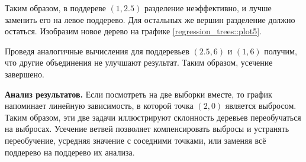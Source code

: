     Таким образом, в поддереве $(1, 2.5)$ разделение неэффективно, и лучше заменить его на левое поддерево. Для остальных же вершин разделение должно остаться. Изобразим новое дерево на графике \ref{regression_trees::plot5}.
    
    \begin{center}
    \end{center}    

    Проведя аналогичные вычисления для поддеревьев $(2.5, 6)$ и $(1, 6)$ получим, что другие объединения не улучшают результат. Таким образом, усечение завершено.

    \textbf{Анализ результатов.} Если посмотреть на две выборки вместе, то график напоминает линейную зависимость, в которой точка $(2, 0)$ является выбросом. Таким образом, эти две задачи иллюстрируют склонность деревьев переобучаться на выбросах. Усечение ветвей позволяет компенсировать выбросы и устранять переобучение, усредняя значение с соседними точками, или заменяя всё поддерево на поддерево их анализа. 
